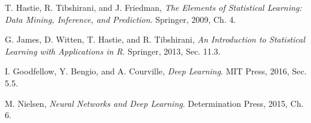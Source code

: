 \documentclass{article}
\begin{document}
\begin{thebibliography}{9}

T. Hastie, R. Tibshirani, and J. Friedman,
\textit{The Elements of Statistical Learning: Data Mining, Inference, and Prediction}.
Springer, 2009, Ch. 4.

G. James, D. Witten, T. Hastie, and R. Tibshirani,
\textit{An Introduction to Statistical Learning with Applications in R}.
Springer, 2013, Sec. 11.3.

I. Goodfellow, Y. Bengio, and A. Courville,
\textit{Deep Learning}.
MIT Press, 2016, Sec. 5.5.

M. Nielsen,
\textit{Neural Networks and Deep Learning}.
Determination Press, 2015, Ch. 6.

\end{thebibliography}
\end{document}

